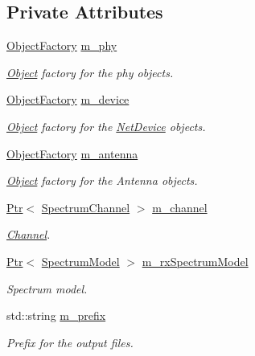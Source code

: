 \subsection*{Private Attributes}
\begin{DoxyCompactItemize}
\item 
\hyperlink{classns3_1_1ObjectFactory}{Object\+Factory} \hyperlink{classns3_1_1SpectrumAnalyzerHelper_a10d772392b256780b85f4c70e3232871}{m\+\_\+phy}
\begin{DoxyCompactList}\small\item\em \hyperlink{classns3_1_1Object}{Object} factory for the phy objects. \end{DoxyCompactList}\item 
\hyperlink{classns3_1_1ObjectFactory}{Object\+Factory} \hyperlink{classns3_1_1SpectrumAnalyzerHelper_af3f584284b42fb8225ba300448592640}{m\+\_\+device}
\begin{DoxyCompactList}\small\item\em \hyperlink{classns3_1_1Object}{Object} factory for the \hyperlink{classns3_1_1NetDevice}{Net\+Device} objects. \end{DoxyCompactList}\item 
\hyperlink{classns3_1_1ObjectFactory}{Object\+Factory} \hyperlink{classns3_1_1SpectrumAnalyzerHelper_a95c263f9a61fc6cb4c50a46b8d17b2f9}{m\+\_\+antenna}
\begin{DoxyCompactList}\small\item\em \hyperlink{classns3_1_1Object}{Object} factory for the Antenna objects. \end{DoxyCompactList}\item 
\hyperlink{classns3_1_1Ptr}{Ptr}$<$ \hyperlink{classns3_1_1SpectrumChannel}{Spectrum\+Channel} $>$ \hyperlink{classns3_1_1SpectrumAnalyzerHelper_aed344c92a7114c00966bdab699c01c8a}{m\+\_\+channel}
\begin{DoxyCompactList}\small\item\em \hyperlink{classns3_1_1Channel}{Channel}. \end{DoxyCompactList}\item 
\hyperlink{classns3_1_1Ptr}{Ptr}$<$ \hyperlink{classns3_1_1SpectrumModel}{Spectrum\+Model} $>$ \hyperlink{classns3_1_1SpectrumAnalyzerHelper_a335d8920926adc5e812c0facefa61686}{m\+\_\+rx\+Spectrum\+Model}
\begin{DoxyCompactList}\small\item\em Spectrum model. \end{DoxyCompactList}\item 
std\+::string \hyperlink{classns3_1_1SpectrumAnalyzerHelper_ac8e562a06ed94a4c76b8a0acdb6de16d}{m\+\_\+prefix}
\begin{DoxyCompactList}\small\item\em Prefix for the output files. \end{DoxyCompactList}\end{DoxyCompactItemize}


